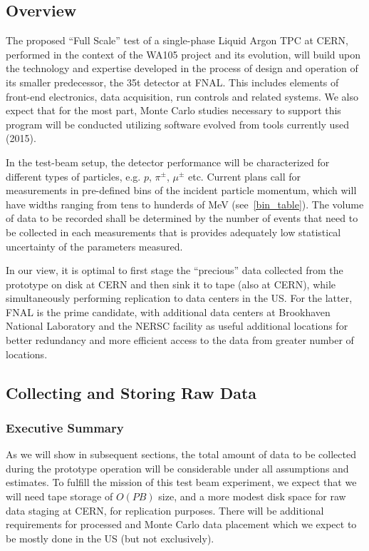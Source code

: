
\subsection{Overview}
The proposed ``Full Scale'' test of a single-phase Liquid Argon TPC at CERN, performed in the context of the WA105 project and its evolution,
will build upon the technology and expertise developed in the process of design and operation of its smaller predecessor, the 35t detector at FNAL.
This includes elements of front-end electronics, data acquisition, run controls and related systems. We also expect that for the most part,
Monte Carlo studies necessary to support this program will be conducted utilizing software evolved from tools currently used (2015).

In the test-beam setup, the detector performance will be characterized for different types of particles, e.g. $p$, $\pi^{\pm}$, $\mu^{\pm}$ etc.
Current plans call for measurements in pre-defined bins of the incident particle momentum, which will have widths ranging from tens to
hunderds of MeV (see~\ref{bin_table}). The volume of data to be recorded shall be determined by the number of events that need to be collected in each measurements that is
provides adequately low statistical uncertainty of the parameters measured.

In our view, it is optimal to first stage the ``precious'' data collected from the prototype on disk at CERN and then sink it to tape (also at CERN),
while simultaneously performing replication to data centers in the US. For the latter, FNAL is the prime candidate, with additional data centers at Brookhaven National Laboratory
and the NERSC facility as useful additional locations for better redundancy and more efficient access to the data from greater number of locations.

\subsection{Collecting and Storing Raw Data}

\subsubsection{Executive Summary}
As we will show in subsequent sections, the total amount of data to be collected during the prototype operation will be considerable under
all assumptions and estimates. To fulfill the mission of this test beam experiment, we expect that we will need tape storage of $O(PB)$ size,
and a more modest disk space for raw data staging at CERN, for replication purposes. There will be additional requirements for processed and
Monte Carlo data placement which we expect to be mostly done in the US (but not exclusively).

